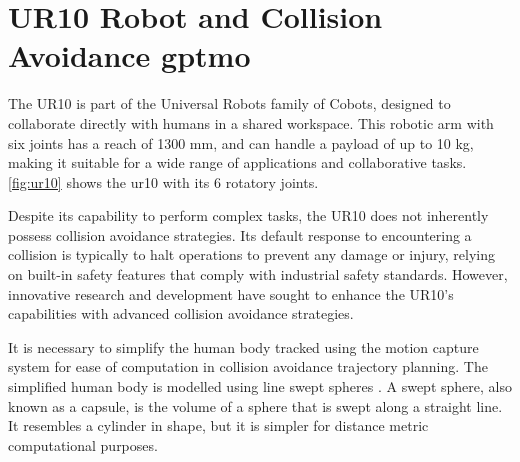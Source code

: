 \section{UR10 Robot and Collision Avoidance \gls{gptmo}}
The UR10 is part of the Universal Robots family of \gls{Cobots}, designed to collaborate directly with humans in a shared workspace. This robotic arm with six joints has a reach of 1300 mm, and can handle a payload of up to 10 kg, making it suitable for a wide range of applications and collaborative tasks. \autoref{fig:ur10} shows the ur10 with its 6 rotatory joints.

Despite its capability to perform complex tasks, the UR10 does not inherently possess collision avoidance strategies. Its default response to encountering a collision is typically to halt operations to prevent any damage or injury, relying on built-in safety features that comply with industrial safety standards. However, innovative research and development have sought to enhance the UR10's capabilities with advanced collision avoidance strategies.

It is necessary to simplify the human body tracked using the motion capture system  for ease of computation in collision avoidance trajectory planning. The simplified human body is modelled using line swept spheres \parencite{larsen}. A swept sphere, also known as a capsule, is the volume of a sphere that is swept along a straight line. It resembles a cylinder in shape, but it is simpler for distance metric computational purposes. 


